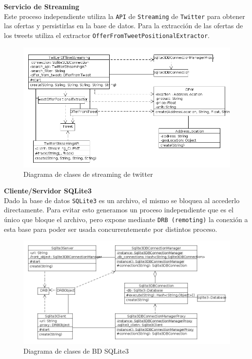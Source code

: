 \textbf{Servicio de Streaming}\\

Este proceso independiente utiliza la \texttt{API} de \texttt{Streaming} de \texttt{Twitter} para obtener las ofertas y persistirlas en la base de datos.
Para la extracci\'on de las ofertas de los tweets utiliza el extractor \texttt{OfferFromTweetPositionalExtractor}.

\begin{figure}[h]
\centerline{\includegraphics[width=\textwidth]{./imgs/class_diagram_offline_streaming.png}}
\caption{Diagrama de clases de streaming de twitter}
\label{fig:class_offline_streaming}
\end{figure}


\textbf{Cliente/Servidor SQLite3}\\

Dado la base de datos \texttt{SQLite3} es un archivo, el mismo se bloquea al accederlo
directamente. Para evitar esto generamos un proceso independiente que es el \'unico que bloque el archivo, pero expone mediante \texttt{DRB (remoting)} la conexi\'on a esta base para poder ser usada concurrentemente por distintos proceso.

\begin{figure}[h]
\centerline{\includegraphics[width=\textwidth]{./imgs/class_diagram_sqlite3_client_server.png}}
\caption{Diagrama de clases de BD SQLite3}
\label{fig:class_sqlite3_client_server}
\end{figure}

